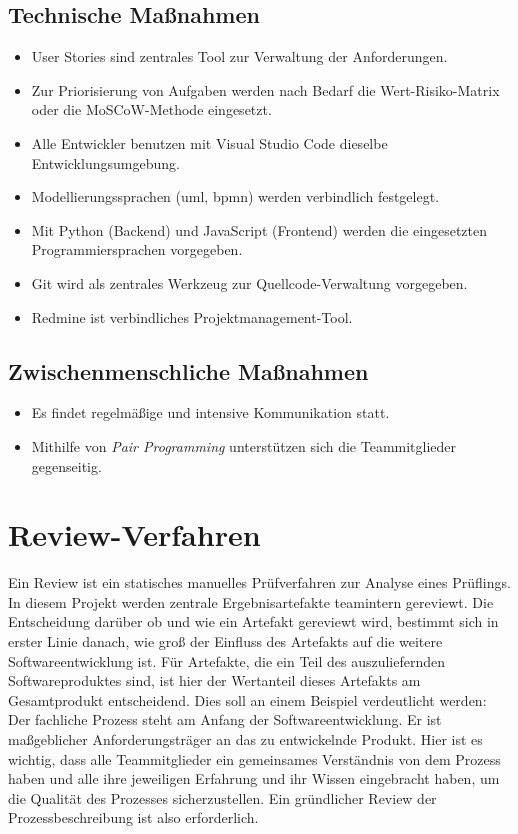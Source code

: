\documentclass[a4paper,11pt,listof=numbered,glossary=totoc,parskip=half,toc=bib]{scrreprt}
\begin{document}
	\subsection{Technische Maßnahmen}
	\begin{itemize}
		\item User Stories sind zentrales Tool zur Verwaltung der Anforderungen.
		\item Zur Priorisierung von Aufgaben werden nach Bedarf die Wert-Risiko-Matrix oder die MoSCoW-Methode eingesetzt. 
		\item Alle Entwickler benutzen mit Visual Studio Code dieselbe Entwicklungsumgebung.
		\item Modellierungssprachen (\Gls{uml}, \Gls{bpmn}) werden verbindlich festgelegt.
		\item Mit Python (Backend) und JavaScript (Frontend) werden die eingesetzten Programmiersprachen vorgegeben.
		\item Git wird als zentrales Werkzeug zur Quellcode-Verwaltung vorgegeben.
		\item Redmine ist verbindliches Projektmanagement-Tool.
	\end{itemize}
	
	\subsection{Zwischenmenschliche Maßnahmen}
	\begin{itemize}
		\item Es findet regelmäßige und intensive Kommunikation statt.
		\item Mithilfe von \textit{Pair Programming} unterstützen sich die Teammitglieder gegenseitig.
	\end{itemize}		
	
\section{Review-Verfahren}	
Ein Review ist ein statisches manuelles Prüfverfahren zur Analyse eines Prüflings. In diesem Projekt werden zentrale Ergebnisartefakte teamintern gereviewt. Die Entscheidung darüber ob und wie ein Artefakt gereviewt wird, bestimmt sich in erster Linie danach, wie groß der Einfluss des Artefakts auf die weitere Softwareentwicklung ist. Für Artefakte, die ein Teil des auszuliefernden Softwareproduktes sind, ist hier der Wertanteil dieses Artefakts am Gesamtprodukt entscheidend. Dies soll an einem Beispiel verdeutlicht werden: Der fachliche Prozess steht am Anfang der Softwareentwicklung. Er ist maßgeblicher Anforderungsträger an das zu entwickelnde Produkt. Hier ist es wichtig, dass alle Teammitglieder ein gemeinsames Verständnis von dem Prozess haben und alle ihre jeweiligen Erfahrung und ihr Wissen eingebracht haben, um die Qualität des Prozesses sicherzustellen. Ein gründlicher Review der Prozessbeschreibung ist also erforderlich. 
\end{document}
